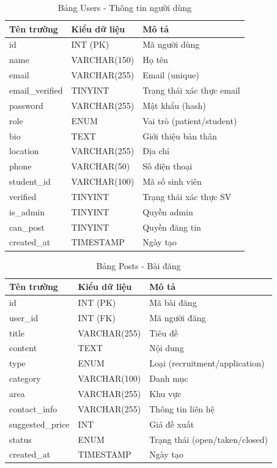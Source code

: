 \documentclass[a4paper,12pt]{report}
\begin{document}
\begin{table}[H]
\centering
\caption{Bảng Users - Thông tin người dùng}
\begin{tabular}{|l|l|l|}
\hline
\textbf{Tên trường} & \textbf{Kiểu dữ liệu} & \textbf{Mô tả} \\
\hline
id & INT (PK) & Mã người dùng \\
name & VARCHAR(150) & Họ tên \\
email & VARCHAR(255) & Email (unique) \\
email\_verified & TINYINT & Trạng thái xác thực email \\
password & VARCHAR(255) & Mật khẩu (hash) \\
role & ENUM & Vai trò (patient/student) \\
bio & TEXT & Giới thiệu bản thân \\
location & VARCHAR(255) & Địa chỉ \\
phone & VARCHAR(50) & Số điện thoại \\
student\_id & VARCHAR(100) & Mã số sinh viên \\
verified & TINYINT & Trạng thái xác thực SV \\
is\_admin & TINYINT & Quyền admin \\
can\_post & TINYINT & Quyền đăng tin \\
created\_at & TIMESTAMP & Ngày tạo \\
\hline
\end{tabular}
\end{table}

\begin{table}[H]
\centering
\caption{Bảng Posts - Bài đăng}
\begin{tabular}{|l|l|l|}
\hline
\textbf{Tên trường} & \textbf{Kiểu dữ liệu} & \textbf{Mô tả} \\
\hline
id & INT (PK) & Mã bài đăng \\
user\_id & INT (FK) & Mã người đăng \\
title & VARCHAR(255) & Tiêu đề \\
content & TEXT & Nội dung \\
type & ENUM & Loại (recruitment/application) \\
category & VARCHAR(100) & Danh mục \\
area & VARCHAR(255) & Khu vực \\
contact\_info & VARCHAR(255) & Thông tin liên hệ \\
suggested\_price & INT & Giá đề xuất \\
status & ENUM & Trạng thái (open/taken/closed) \\
created\_at & TIMESTAMP & Ngày tạo \\
\hline
\end{tabular}
\end{table}
\end{document}
